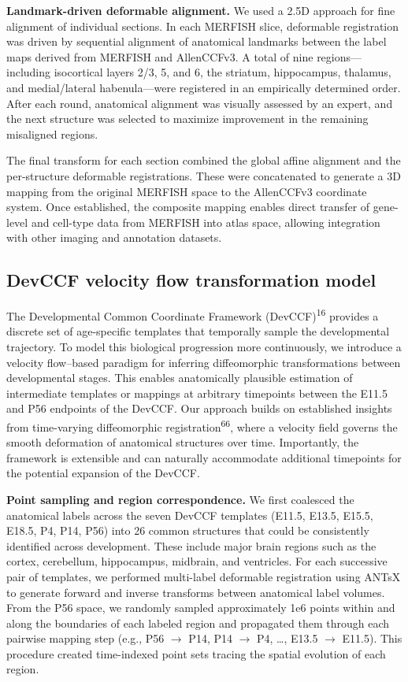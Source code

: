 \documentclass[
  12pt,
]{article}
\begin{document}
\textbf{Landmark-driven deformable alignment.} We used a 2.5D approach
for fine alignment of individual sections. In each MERFISH slice,
deformable registration was driven by sequential alignment of anatomical
landmarks between the label maps derived from MERFISH and AllenCCFv3. A
total of nine regions---including isocortical layers 2/3, 5, and 6, the
striatum, hippocampus, thalamus, and medial/lateral habenula---were
registered in an empirically determined order. After each round,
anatomical alignment was visually assessed by an expert, and the next
structure was selected to maximize improvement in the remaining
misaligned regions.

The final transform for each section combined the global affine
alignment and the per-structure deformable registrations. These were
concatenated to generate a 3D mapping from the original MERFISH space to
the AllenCCFv3 coordinate system. Once established, the composite
mapping enables direct transfer of gene-level and cell-type data from
MERFISH into atlas space, allowing integration with other imaging and
annotation datasets.

\subsection{DevCCF velocity flow transformation
model}\label{devccf-velocity-flow-transformation-model}

The Developmental Common Coordinate Framework
(DevCCF)\textsuperscript{16} provides a discrete set of age-specific
templates that temporally sample the developmental trajectory. To model
this biological progression more continuously, we introduce a velocity
flow--based paradigm for inferring diffeomorphic transformations between
developmental stages. This enables anatomically plausible estimation of
intermediate templates or mappings at arbitrary timepoints between the
E11.5 and P56 endpoints of the DevCCF. Our approach builds on
established insights from time-varying diffeomorphic
registration\textsuperscript{66}, where a velocity field governs the
smooth deformation of anatomical structures over time. Importantly, the
framework is extensible and can naturally accommodate additional
timepoints for the potential expansion of the DevCCF.

\textbf{Point sampling and region correspondence.} We first coalesced
the anatomical labels across the seven DevCCF templates (E11.5, E13.5,
E15.5, E18.5, P4, P14, P56) into 26 common structures that could be
consistently identified across development. These include major brain
regions such as the cortex, cerebellum, hippocampus, midbrain, and
ventricles. For each successive pair of templates, we performed
multi-label deformable registration using ANTsX to generate forward and
inverse transforms between anatomical label volumes. From the P56 space,
we randomly sampled approximately 1e6 points within and along the
boundaries of each labeled region and propagated them through each
pairwise mapping step (e.g., P56 \(\rightarrow\) P14, P14
\(\rightarrow\) P4, \ldots, E13.5 \(\rightarrow\) E11.5). This procedure
created time-indexed point sets tracing the spatial evolution of each
region.
\end{document}

